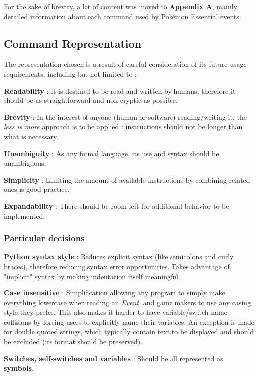 \documentclass[11pt]{article}
\begin{document}
{For the sake of brevity, a lot of content was moved to \textbf{Appendix A}, mainly detailed information about each command used by Pokémon Essential events.



\newpage
\subsection{Command Representation}

The representation chosen is a result of careful consideration of its future usage requirements, including but not limited to :

\textbf{Readability} : It is destined to be read and written by humans, therefore it should be as straightforward and non-cryptic as possible.

\textbf{Brevity} : In the interest of anyone (human or software) reading/writing it, the \textit{less is more} approach is to be applied : instructions should not be longer than what is necessary.

\textbf{Unambiguity} : As any formal language, its use and syntax should be unambiguous.

\textbf{Simplicity} : Limiting the amount of available instructions by combining related ones is good practice.

\textbf{Expandability} : There should be room left for additional behavior to be implemented.



\subsubsection{Particular decisions}


\textbf{Python syntax style} : Reduces explicit syntax (like semicolons and curly braces), therefore reducing syntax error opportunities. Takes advantage of "implicit" syntax by making indentation itself meaningful.

\textbf{Case insensitive} : Simplification allowing any program to simply make everything lowercase when reading an \textit{Event}, and game makers to use any casing style they prefer. This also makes it harder to have variable/switch name collisions by forcing users to explicitly name their variables. An exception is made for double quoted strings, which typically contain text to be displayed and should be excluded (its format should be preserved).

\textbf{Switches, self-switches and variables} : Should be all represented as \textbf{symbols}. 

}
\end{document}
